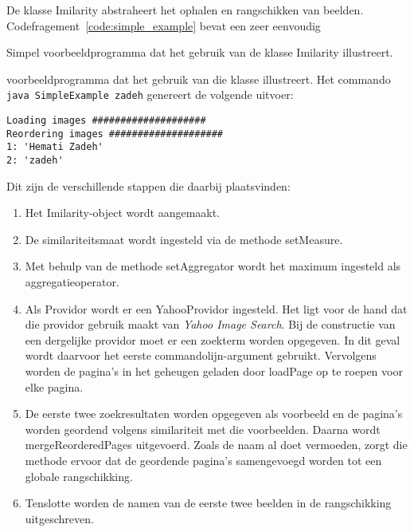 De klasse {\klassefont Imilarity} abstraheert het ophalen en rangschikken van
beelden. Codefragement~\ref{code:simple_example} bevat een zeer eenvoudig 
\begin{code}[bp]
\vspace{5pt}
\begin{lgrind}

\end{lgrind}
\vspace{5pt}
\caption{\label{code:simple_example}Simpel voorbeeldprogramma dat het gebruik van
de klasse {\klassefont Imilarity} illustreert.}
\end{code}
voorbeeldprogramma dat het gebruik van die klasse illustreert. Het commando
\texttt{java SimpleExample zadeh} genereert de volgende uitvoer:
\begin{verbatim}
Loading images ####################
Reordering images ####################
1: 'Hemati Zadeh'
2: 'zadeh'
\end{verbatim} 
Dit zijn de verschillende stappen die daarbij plaatsvinden:
\begin{enumerate}
  \item Het {\klassefont Imilarity}-object wordt aangemaakt.
  \item De similariteitsmaat wordt ingesteld via de methode {\klassefont setMeasure}.
  \item Met behulp van de methode {\klassefont setAggregator} wordt het maximum ingesteld als
		aggregatieoperator. 
  \item Als {\klassefont Providor} wordt er een {\klassefont YahooProvidor} ingesteld.
  	    Het ligt voor de hand dat die providor gebruik maakt van
  	    \emph{Yahoo Image Search}. Bij de constructie van een dergelijke providor
  	    moet er een zoekterm worden opgegeven. In dit geval wordt daarvoor het eerste 
  	    commandolijn-argument gebruikt. Vervolgens worden de pagina's in 
  	    het geheugen geladen door {\klassefont loadPage} op te roepen voor elke pagina.
  \item De eerste twee zoekresultaten worden opgegeven als voorbeeld en de pagina's
        worden geordend volgens similariteit met die voorbeelden. Daarna wordt
        {\klassefont mergeReorderedPages} uitgevoerd. Zoals de naam al doet vermoeden,
        zorgt die methode ervoor dat de geordende pagina's samengevoegd 
        worden tot een globale rangschikking.
  \item Tenslotte worden de namen van de eerste twee beelden in de rangschikking 
  	    uitgeschreven.
\end{enumerate}

